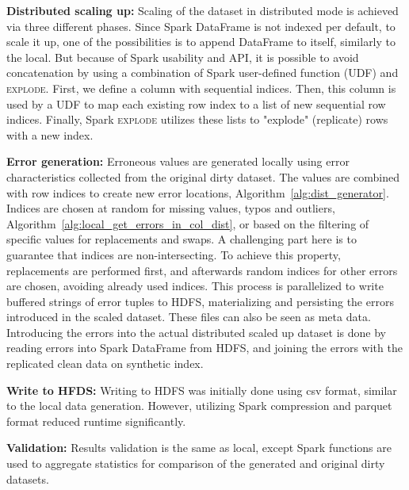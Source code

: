 \textbf{Distributed scaling up:}
Scaling of the dataset in distributed mode is achieved via three different phases. 
Since Spark DataFrame is not indexed per default, to scale it up, one of the possibilities is to append DataFrame to itself, similarly to the local.
But because of Spark usability and API, it is possible to avoid concatenation by using a combination of Spark user-defined function (\textsc{UDF}) and \textsc{explode}.
First, we define a column with sequential indices. 
Then, this column is used by a \textsc{UDF} to map each existing row index to a list of new sequential row indices.
Finally, Spark \textsc{explode} utilizes these lists to "explode" (replicate) rows with a new index.



\textbf{Error generation:} 
Erroneous values are generated locally using error characteristics collected from the original dirty dataset.
The values are combined with row indices to create new error locations, Algorithm~\ref{alg:dist_generator}.
Indices are chosen at random for missing values, typos and outliers, Algorithm~\ref{alg:local_get_errors_in_col_dist}, or based on the filtering of specific values for replacements and swaps.
A challenging part here is to guarantee that indices are non-intersecting. 
To achieve this property, replacements are performed first, and afterwards random indices for other errors are chosen, avoiding already used indices.
This process is parallelized to write buffered strings of error tuples to HDFS, materializing and persisting the errors introduced in the scaled dataset.
These files can also be seen as meta data.
Introducing the errors into the actual distributed scaled up dataset is done by reading errors into Spark DataFrame from HDFS, and joining the errors with the replicated clean data on synthetic index.

\textbf{Write to HFDS:} 
Writing to HDFS was initially done using csv format, similar to the local data generation.
However, utilizing Spark compression and parquet format reduced runtime significantly.

\textbf{Validation:}  
Results validation is the same as local, except Spark functions are used to aggregate statistics for comparison of the generated and original dirty datasets.


